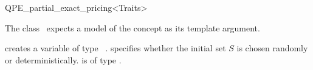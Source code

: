 \begin{ccRefClass}{QPE_partial_exact_pricing<Traits>}

\ccInheritsFrom
{}

\ccRequirements
\ccIndexRequirements

The class \ccRefName\ expects a model of the concept
 as its template argument. 


\ccTypes \ccIndexClassTypes


\ccCreation
\ccIndexClassCreation
{}

{creates a variable of type \ccRefName\ .  specifies
whether the initial set $S$ is chosen randomly or deterministically.
 is of type .}


\ccUnchecked

\ccAccessFunctions
\begin{ccIndexMemberFunctions}




\ccModifiers
{}





\end{ccIndexMemberFunctions}

%
%
%
%


\end{ccRefClass}
